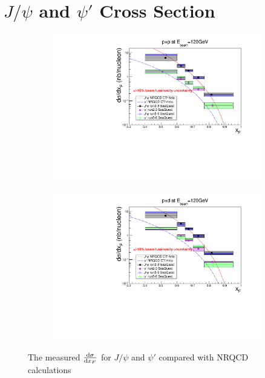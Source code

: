 \documentclass[twocolumn,aps,unsortedaddress,superscriptaddress,prd,floatfix,showpacs,linenumbers]{revtex4-2}
\begin{document}
\section{\texorpdfstring{$J/\psi$}{J/psi} and \texorpdfstring{$\psi'$}{psi'} Cross Section}
\label{sec:cross_section}
\begin{figure}
	\begin{subfigure}{0.45\linewidth}
		\includegraphics[width=\linewidth]{figures/crossSections/xF/combine_xF_LH2_5-6_5770_psip}
	\end{subfigure}
	\begin{subfigure}{0.45\linewidth}
		\includegraphics[width=\linewidth]{figures/crossSections/xF/combine_xF_LD2_5-6_5770_psip}
	\end{subfigure}
	\caption{The measured $\dv{\sigma}{x_F}$ for $J/\psi$ and $\psi'$ compared with NRQCD calculations}
	\label{fig:xF_cross_sections}
\end{figure}
\end{document}
